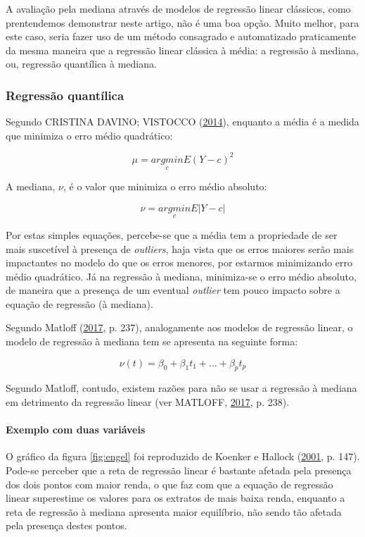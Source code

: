 \documentclass[a4paper, 12pt]{article}
\let\oldparagraph\paragraph
\renewcommand{\paragraph}[1]{\oldparagraph{#1}\mbox{}}
\begin{document}
A avaliação pela mediana através de modelos de regressão linear
clássicos, como prentendemos demonstrar neste artigo, não é uma boa
opção. Muito melhor, para este caso, seria fazer uso de um método
consagrado e automatizado praticamente da mesma maneira que a regressão
linear clássica à média: a regressão à mediana, ou, regressão quantílica
à mediana.

\subsubsection{Regressão quantílica}\label{regressao-quantilica}

Segundo CRISTINA DAVINO; VISTOCCO (\protect\hyperlink{ref-QR}{2014}),
enquanto a média é a medida que minimiza o erro médio quadrático:

\[\mu = \underset{c}{argmin} E(Y - c)^2\]

A mediana, \(\nu\), é o valor que minimiza o erro médio absoluto:

\[\nu = \underset{c}{argmin} E|Y-c|\]

Por estas simples equações, percebe-se que a média tem a propriedade de
ser mais suscetível à presença de \emph{outliers}, haja vista que os
erros maiores serão mais impactantes no modelo do que os erros menores,
por estarmos minimizando erro médio quadrático. Já na regressão à
mediana, minimiza-se o erro médio absoluto, de maneira que a presença de
um eventual \emph{outlier} tem pouco impacto sobre a equação de
regressão (à mediana).

Segundo Matloff (\protect\hyperlink{ref-matloff2017}{2017}, p. 237),
analogamente aos modelos de regressão linear, o modelo de regressão à
mediana tem se apresenta na seguinte forma:

\[\nu(t) = \beta_0 + \beta_1t_1 + \ldots + \beta_pt_p\]

Segundo Matloff, contudo, existem razões para não se usar a regressão à
mediana em detrimento da regressão linear (ver MATLOFF,
\protect\hyperlink{ref-matloff2017}{2017}, p. 238).

\paragraph{Exemplo com duas variáveis}\label{exemplo-com-duas-variaveis}

O gráfico da figura \ref{fig:engel} foi reproduzido de Koenker e Hallock
(\protect\hyperlink{ref-koenker}{2001}, p. 147). Pode-se perceber que a
reta de regressão linear é bastante afetada pela presença dos dois
pontos com maior renda, o que faz com que a equação de regressão linear
superestime os valores para os extratos de mais baixa renda, enquanto a
reta de regressão à mediana apresenta maior equilíbrio, não sendo tão
afetada pela presença destes pontos.
\end{document}
